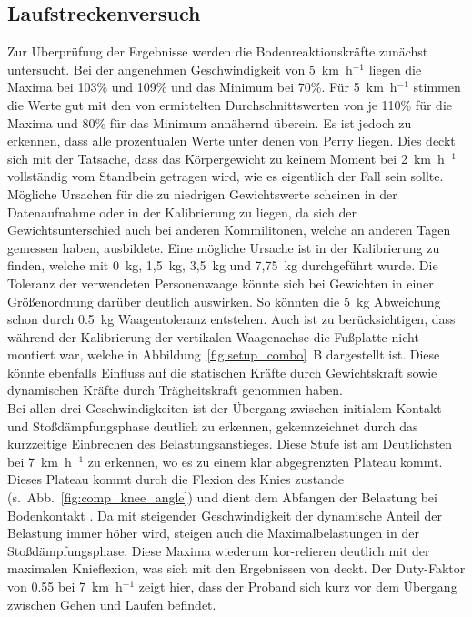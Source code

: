\subsection{Laufstreckenversuch}
Zur Überprüfung der Ergebnisse werden die Bodenreaktionskräfte zunächst untersucht. Bei der angenehmen Geschwindigkeit von 5~km~h$^{-1}$ liegen die Maxima bei 103\% und 109\% und das Minimum bei 70\%. Für 5~km~h$^{-1}$ stimmen die Werte gut mit den von \textcite{perry2010gait} ermittelten Durchschnittswerten von je 110\% für die Maxima und 80\% für das Minimum annähernd überein. Es ist jedoch zu erkennen, dass alle prozentualen Werte unter denen von Perry liegen. Dies deckt sich mit der Tatsache, dass das Körpergewicht zu keinem Moment bei 2~km~h$^{-1}$ vollständig vom Standbein getragen wird, wie es eigentlich der Fall sein sollte. Mögliche Ursachen für die zu niedrigen Gewichtswerte scheinen in der Datenaufnahme oder in der Kalibrierung zu liegen, da sich der Gewichtsunterschied auch bei anderen Kommilitonen, welche an anderen Tagen gemessen haben, ausbildete. Eine mögliche Ursache ist in der Kalibrierung zu finden, welche mit 0~kg, 1,5~kg, 3,5~kg und 7,75~kg durchgeführt wurde. Die Toleranz der verwendeten Personenwaage könnte sich bei Gewichten in einer Größenordnung darüber deutlich auswirken. So könnten die 5~kg Abweichung schon durch 0.5~kg Waagentoleranz entstehen. Auch ist zu berücksichtigen, dass während der Kalibrierung der vertikalen Waagenachse die Fußplatte nicht montiert war, welche in Abbildung~\ref{fig:setup_combo}~B dargestellt ist. Diese könnte ebenfalls Einfluss auf die statischen Kräfte durch Gewichtskraft sowie dynamischen Kräfte durch Trägheitskraft genommen haben.\\
Bei allen drei Geschwindigkeiten ist der Übergang zwischen initialem Kontakt und Stoßdämpfungsphase deutlich zu erkennen, gekennzeichnet durch das kurzzeitige Einbrechen des Belastungsanstieges. Diese Stufe ist am Deutlichsten bei 7~km~h$^{-1}$ zu erkennen, wo es zu einem klar abgegrenzten Plateau kommt. Dieses Plateau kommt durch die Flexion des Knies zustande (s.~Abb.~\ref{fig:comp_knee_angle}) und dient dem Abfangen der Belastung bei Bodenkontakt \parencite{perry2010gait}. Da mit steigender Geschwindigkeit der dynamische Anteil der Belastung immer höher wird, steigen auch die Maximalbelastungen in der Stoßdämpfungsphase. Diese Maxima wiederum kor-relieren deutlich mit der maximalen Knieflexion, was sich mit den Ergebnissen von \textcite{kirtley1985influence} deckt. Der Duty-Faktor von 0.55 bei 7~km~h$^{-1}$ zeigt hier, dass der Proband sich kurz vor dem Übergang zwischen Gehen und Laufen befindet.\\
